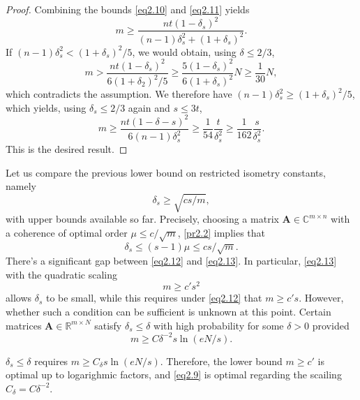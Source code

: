 \begin{proof}
    Combining the bounds \cref{eq2.10} and \cref{eq2.11} yields
    \[
        m \geq \dfrac{nt(1- \delta_s)^2}{(n-1)\delta_s^2 + (1+\delta_s)^2}.
    \]
    If $(n-1)\delta_s^2 < (1 + \delta_s)^2/5$, we would obtain, using $\delta \leq 2/3$,
    \[
        m > \dfrac{nt(1-\delta_s)^2}{6(1 + \delta_2)^2/5} \geq \dfrac{5(1-\delta_s)^2}{6(1+ \delta_s)^2} N \geq \dfrac{1}{30}N,
    \]
    which contradicts the assumption. We therefore have $(n-1)\delta_s^2 \geq (1+\delta_s)^2 /5$, which yields, using $\delta_s \leq 2/3$ again and $s \leq 3t$,
    \[
        m \geq \dfrac{nt(1-\delta-s)^2}{6(n-1)\delta_s^2} \geq \dfrac{1}{54} \dfrac{t}{\delta_s^2} \geq \dfrac{1}{162} \dfrac{s}{\delta_s^2}.
    \]
    This is the desired result.
\end{proof}

Let us compare the previous lower bound on restricted isometry constants, namely
\begin{equation}
    \delta_s \geq \sqrt{cs/m},
    \label{eq2.12}
\end{equation}
with upper bounds available so far. Precisely, choosing a matrix $\mathbf{A} \in \mathbb{C}^{m \times n}$ with a coherence of optimal order $\mu \leq c/\sqrt{m}$, \cref{pr2.2} implies that
\begin{equation}
    \delta_s \leq (s-1)\mu \leq cs/\sqrt{m}.
    \label{eq2.13}
\end{equation}
There's a significant gap between \cref{eq2.12} and \cref{eq2.13}. In particular, \cref{eq2.13} with the quadratic scaling
\begin{equation}
    m \geq c's^2
    \label{eq2.14}
\end{equation}
allows $\delta_s$ to be small, while this requires under \cref{eq2.12} that $m \geq c's$. However, whether such a condition can be sufficient is unknown at this point. Certain matrices $\mathbf{A} \in \mathbb{R}^{m \times N}$ satisfy $\delta_s \leq \delta$ with high probability for some $\delta > 0$ provided
\begin{equation}
    m \geq C \delta^{-2} s \ln(eN/s).
    \label{eq2.15}
\end{equation}

$\delta_s \leq \delta$ requires $m \geq C_{\delta}s\ln(eN/s)$. Therefore, the lower bound $m \geq c'$ is optimal up to logarighmic factors, and \cref{eq2.9} is optimal regarding the scailing $C_{\delta} = C \delta^{-2}$.


















